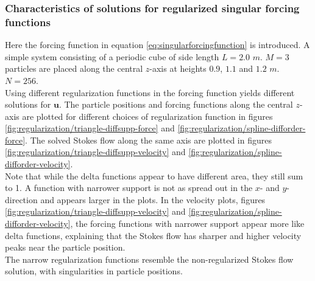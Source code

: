 \documentclass[a4paper,
twoside=false,abstract=false,numbers=noenddot,
titlepage=false,headings=small,parskip=half,version=last]{scrartcl}
\begin{document}
\subsubsection{Characteristics of solutions for regularized singular forcing functions}\label{section:regul-results}
Here the forcing function in equation \eqref{eq:singularforcingfunction} is introduced.
A simple system consisting of a periodic cube of side length $L=2.0$ $m$. $M=3$ particles are placed along the central $z$-axis at heights $0.9$, $1.1$ and $1.2$ $m$. $N=256$.\\
Using different regularization functions in the forcing function yields different solutions for $\mathbf{u}$.
The particle positions and forcing functions along the central $z$-axis are plotted for different choices of regularization function in figures \ref{fig:regularization/triangle-diffsupp-force} and \ref{fig:regularization/spline-difforder-force}.
The solved Stokes flow along the same axis are plotted in figures \ref{fig:regularization/triangle-diffsupp-velocity} and \ref{fig:regularization/spline-difforder-velocity}.\\
Note that while the delta functions appear to have different area, they still sum to 1.
A function with narrower support is not as spread out in the $x$- and $y$-direction and appears larger in the plots.
In the velocity plots, figures \ref{fig:regularization/triangle-diffsupp-velocity} and \ref{fig:regularization/spline-difforder-velocity}, the forcing functions with narrower support appear more like delta functions, explaining that the Stokes flow has sharper and higher velocity peaks near the particle position.\\
The narrow regularization functions resemble the non-regularized Stokes flow solution, with singularities in particle positions.
\end{document}

